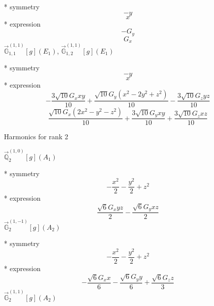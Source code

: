 \documentclass[fleqn,8pt]{jsarticle}
\begin{document}
\noindent\quad ** symmetry
\begin{dmath*}
- y
\end{dmath*}
\begin{dmath*}
x
\end{dmath*}
\noindent\quad ** expression
\begin{dmath*}
- G_{y}
\end{dmath*}
\begin{dmath*}
G_{x}
\end{dmath*}
\noindent\quad $\vec{\mathbb{G}}_{1,1}^{(1,1)}[g](E_{1})$, $\vec{\mathbb{G}}_{1,2}^{(1,1)}[g](E_{1})$

\noindent\quad ** symmetry
\begin{dmath*}
- y
\end{dmath*}
\begin{dmath*}
x
\end{dmath*}
\noindent\quad ** expression
\begin{dmath*}
- \frac{3 \sqrt{10} G_{x} x y}{10} + \frac{\sqrt{10} G_{y} \left(x^{2} - 2 y^{2} + z^{2}\right)}{10} - \frac{3 \sqrt{10} G_{z} y z}{10}
\end{dmath*}
\begin{dmath*}
\frac{\sqrt{10} G_{x} \left(2 x^{2} - y^{2} - z^{2}\right)}{10} + \frac{3 \sqrt{10} G_{y} x y}{10} + \frac{3 \sqrt{10} G_{z} x z}{10}
\end{dmath*}

\noindent * Harmonics for rank 2

\noindent\quad $\vec{\mathbb{Q}}_{2}^{(1,0)}[g](A_{1})$

\noindent\quad ** symmetry
\begin{dmath*}
- \frac{x^{2}}{2} - \frac{y^{2}}{2} + z^{2}
\end{dmath*}
\noindent\quad ** expression
\begin{dmath*}
\frac{\sqrt{6} G_{x} y z}{2} - \frac{\sqrt{6} G_{y} x z}{2}
\end{dmath*}
\noindent\quad $\vec{\mathbb{G}}_{2}^{(1,-1)}[g](A_{2})$

\noindent\quad ** symmetry
\begin{dmath*}
- \frac{x^{2}}{2} - \frac{y^{2}}{2} + z^{2}
\end{dmath*}
\noindent\quad ** expression
\begin{dmath*}
- \frac{\sqrt{6} G_{x} x}{6} - \frac{\sqrt{6} G_{y} y}{6} + \frac{\sqrt{6} G_{z} z}{3}
\end{dmath*}
\noindent\quad $\vec{\mathbb{G}}_{2}^{(1,1)}[g](A_{2})$
\end{document}
